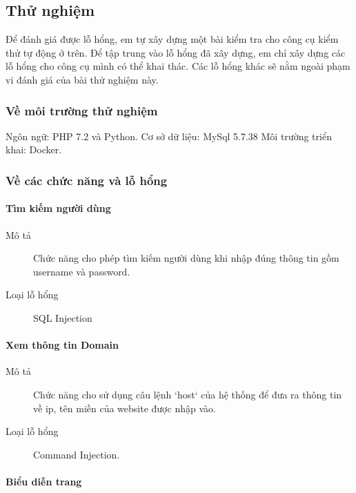 \documentclass[./../main.tex]{subfiles}
\begin{document}
\subsection{Thử nghiệm}

Để đánh giá được lỗ hổng, em tự xây dựng một bài kiểm tra cho công cụ kiểm thử tự động ở trên. Để tập trung vào lỗ hổng đã xây dựng, em chỉ xây dựng các lỗ hổng cho công cụ mình có thể khai thác. Các lỗ hổng khác sẽ nằm ngoài phạm vi đánh giá của bài thử nghiệm này.

\subsubsection{Về môi trường thử nghiệm}

Ngôn ngữ: PHP 7.2 và Python.
Cơ sở dữ liệu: MySql 5.7.38
Môi trường triển khai: Docker.

\subsubsection{Về các chức năng và lỗ hổng}

\paragraph{Tìm kiếm người dùng}

\begin{description}
	\item[Mô tả] Chức năng cho phép tìm kiếm người dùng khi nhập đúng thông tin gồm username và password.
	\item [Loại lỗ hổng] SQL Injection
\end{description}

\paragraph{Xem thông tin Domain}

\begin{description}
	\item[Mô tả] Chức năng cho sử dụng câu lệnh `host` của hệ thống để đưa ra thông tin về ip, tên miền của website được nhập vào.
	\item[Loại lỗ hổng] Command Injection.
\end{description}

\paragraph{Biểu diễn trang}
\end{document}
